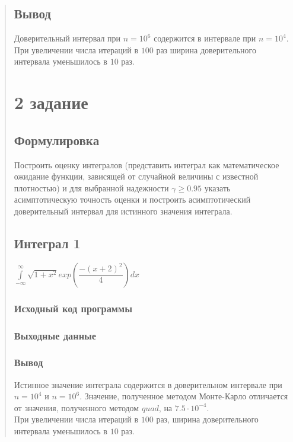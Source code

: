 \documentclass{article}
\begin{document}
\begin{quote}
\subsection{Вывод}
        Доверительный интервал при $n = 10^6$ содержится в интервале при $n = 10^4$.\\
        При увеличении числа итераций в $100$ раз ширина доверительного интервала уменьшилось в $10$ раз.
\section{2 задание}
\subsection{Формулировка}
    Построить оценку интегралов (представить интеграл как математическое ожидание функции,
    зависящей от случайной величины с известной плотностью) и для выбранной надежности $\gamma \geq 0.95$ указать
    асимптотическую точность оценки и построить асимптотический доверительный интервал для истинного
    значения интеграла. 
\subsection{Интеграл 1}
	${\displaystyle \int\limits_{-\infty}^{\infty} \sqrt{1 + x^2} exp \left( \dfrac{-(x + 2)^2}{4} \right) dx}$
	\subsubsection{Исходный код программы}
        	\begin{minipage}{\linewidth}
        	    
        	\end{minipage}
	\subsubsection{Выходные данные}
		\begin{minipage}{\linewidth}
        	    
        	\end{minipage}
	\subsubsection{Вывод}
		Истинное значение интеграла содержится в доверительном интервале при $n = 10^4$ и $n = 10^6$. Значение, полученное методом Монте-Карло отличается от значения, полученного методом $quad$, на $7.5 \cdot 10^{-4}$.\\
        	При увеличении числа итераций в $100$ раз, ширина доверительного интервала уменьшилось в $10$ раз.

\end{quote}
\end{document}
